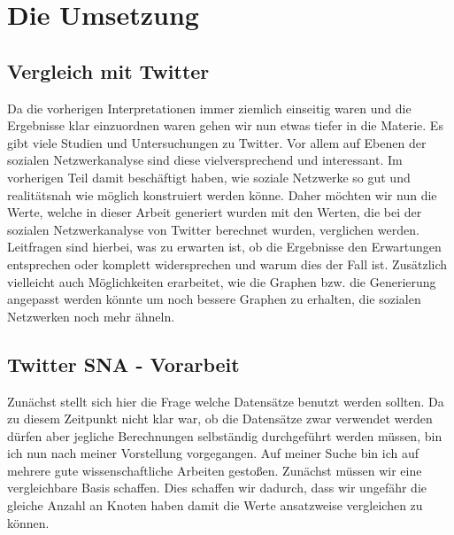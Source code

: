 \chapter{Die Umsetzung}\label{ch:examples}
\section{Vergleich mit Twitter}
Da die vorherigen Interpretationen immer ziemlich einseitig waren und die Ergebnisse klar einzuordnen waren gehen wir nun etwas tiefer in die Materie. Es gibt viele Studien und Untersuchungen zu Twitter. Vor allem auf Ebenen der sozialen Netzwerkanalyse sind diese vielversprechend und interessant. Im vorherigen Teil damit beschäftigt haben, wie soziale Netzwerke so gut und realitätsnah wie möglich konstruiert werden könne. Daher möchten wir nun die Werte, welche in dieser Arbeit generiert wurden mit den Werten, die bei der sozialen Netzwerkanalyse von Twitter berechnet wurden, verglichen werden. Leitfragen sind hierbei, was zu erwarten ist, ob die Ergebnisse den Erwartungen entsprechen oder komplett widersprechen und warum dies der Fall ist. Zusätzlich vielleicht auch Möglichkeiten erarbeitet, wie die Graphen bzw. die Generierung angepasst werden könnte um noch bessere Graphen zu erhalten, die sozialen Netzwerken noch mehr ähneln. 

\section{Twitter SNA - Vorarbeit}
Zunächst stellt sich hier die Frage welche Datensätze benutzt werden sollten. Da zu diesem Zeitpunkt nicht klar war, ob die Datensätze zwar verwendet werden dürfen aber jegliche Berechnungen selbständig durchgeführt werden müssen, bin ich nun nach meiner Vorstellung vorgegangen. Auf meiner Suche bin ich auf mehrere gute wissenschaftliche Arbeiten gestoßen. 
Zunächst müssen wir eine vergleichbare Basis schaffen. Dies schaffen wir dadurch, dass wir ungefähr die gleiche Anzahl an Knoten haben damit die Werte ansatzweise vergleichen zu können.